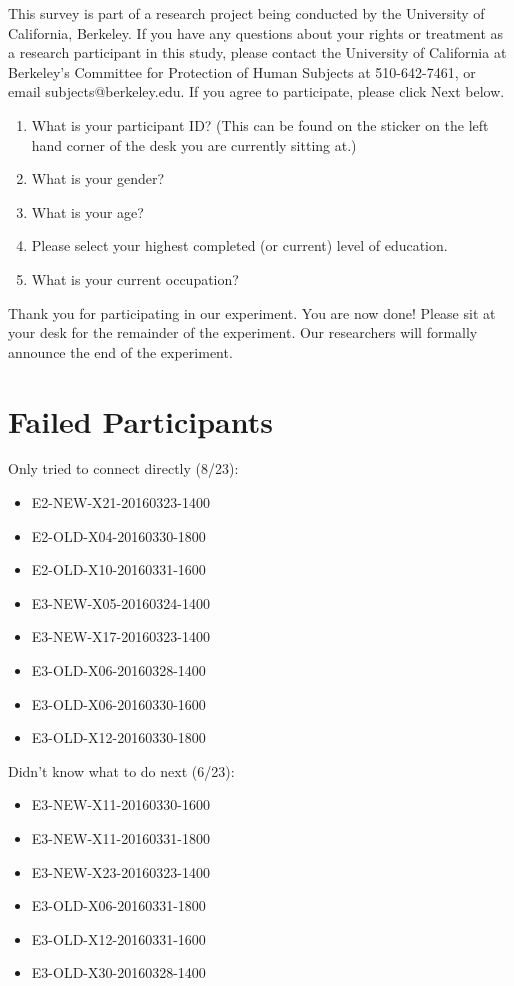 \documentclass[USenglish,oneside,twocolumn]{article}
\begin{document}
This survey is part of a research project being conducted by the University of California, Berkeley. If you have any questions about your rights or treatment as a research participant in this study, please contact the University of California at Berkeley's Committee for Protection of Human Subjects at 510-642-7461, or email subjects@berkeley.edu. If you agree to participate, please click Next below.\\

\begin{enumerate}
\item{What is your participant ID? (This can be found on the sticker on the left hand corner of the desk you are currently sitting at.)}
\item{What is your gender?}
\item{What is your age?}
\item{Please select your highest completed (or current) level of education}.
\item{What is your current occupation?}  
\end{enumerate}

Thank you for participating in our experiment. You are now done! Please sit at your desk for the remainder of the experiment. Our researchers will formally announce the end of the experiment. 

\section{Failed Participants} 
\label{failed-participants}

Only tried to connect directly (8/23): 
\begin{itemize}
\item E2-NEW-X21-20160323-1400
\item E2-OLD-X04-20160330-1800
\item E2-OLD-X10-20160331-1600
\item E3-NEW-X05-20160324-1400
\item E3-NEW-X17-20160323-1400
\item E3-OLD-X06-20160328-1400
\item E3-OLD-X06-20160330-1600
\item E3-OLD-X12-20160330-1800
\end{itemize} 

Didn't know what to do next (6/23): 
\begin{itemize}
\item E3-NEW-X11-20160330-1600
\item E3-NEW-X11-20160331-1800
\item E3-NEW-X23-20160323-1400
\item E3-OLD-X06-20160331-1800
\item E3-OLD-X12-20160331-1600
\item E3-OLD-X30-20160328-1400
\end{itemize} 
\end{document}
